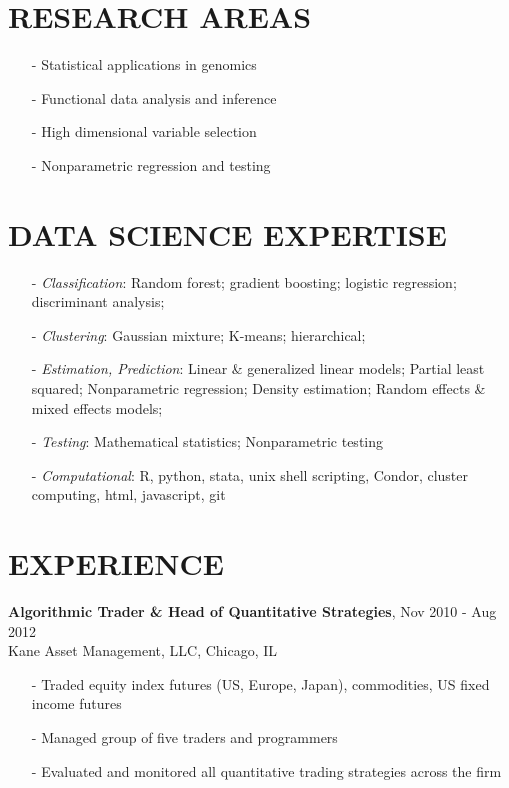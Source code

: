 \documentclass[11pt]{res} %
\begin{document}
\begin{resume}
\section{RESEARCH AREAS} 
\begin{itemize}[leftmargin=*] \itemsep -2pt %
\item[-]Statistical applications in genomics
\item[-]Functional data analysis and inference 
\item[-]High dimensional variable selection
\item[-]Nonparametric regression and testing
\end{itemize}

\section{DATA SCIENCE EXPERTISE} 
\begin{itemize}[leftmargin=*]
\item[-] {\emph{Classification}}: Random forest; gradient boosting; logistic regression; discriminant analysis;
\item[-] {\emph{Clustering}}: Gaussian mixture; K-means; hierarchical; 
\item[-] {\emph{Estimation, Prediction}}: Linear \& generalized linear models; Partial least squared; Nonparametric regression; Density estimation; Random effects \& mixed effects models; 
\item[-] {\emph{Testing}}: Mathematical statistics; Nonparametric testing
\item[-] {\emph{Computational}}: R, python, stata, unix shell scripting, Condor, cluster computing, html, javascript, git
\end{itemize}

\section{EXPERIENCE} 
{\bf{Algorithmic Trader \& Head of Quantitative Strategies}}, \hfill Nov 2010 - Aug 2012 \\
Kane Asset Management, LLC, Chicago, IL
   \begin{itemize} \itemsep -2pt %
   \item[-] Traded equity index futures (US, Europe, Japan), commodities, US fixed income futures
   \item[-] Managed group of five traders and programmers
   \item[-] Evaluated and monitored all quantitative trading strategies across the firm
   \end{itemize}


\end{resume}
\end{document}
